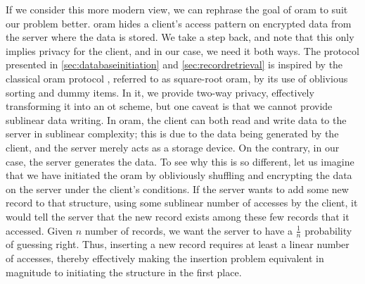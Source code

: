 If we consider this more modern view, we can rephrase the goal of \acrshort{oram} to suit our problem better. \acrshort{oram} hides a client's access pattern on encrypted data from the server where the data is stored. We take a step back, and note that this only implies privacy for the client, and in our case, we need it both ways. The protocol presented in \cref{sec:databaseinitiation} and \cref{sec:recordretrieval} is inspired by the classical \acrshort{oram} protocol \cite{GolOst96}, referred to as square-root \acrshort{oram}, by its use of oblivious sorting and dummy items. In it, we provide two-way privacy, effectively transforming it into an \acrshort{ot} scheme, but one caveat is that we cannot provide sublinear data writing. In \acrshort{oram}, the client can both read and write data to the server in sublinear complexity; this is due to the data being generated by the client, and the server merely acts as a storage device.
On the contrary, in our case, the server generates the data. To see why this is so different, let us imagine that we have initiated the \acrshort{oram} by obliviously shuffling and encrypting the data on the server under the client's conditions. If the server wants to add some new record to that structure, using some sublinear number of accesses by the client, it would tell the server that the new record exists among these few records that it accessed. Given $ n $ number of records, we want the server to have a $ \frac{1}{n} $ probability of guessing right. Thus, inserting a new record requires at least a linear number of accesses, thereby effectively making the insertion problem equivalent in magnitude to initiating the structure in the first place.   
